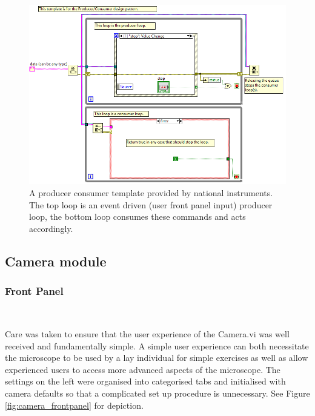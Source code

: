 \begin{figure}
\centering
\includegraphics[width=0.8\linewidth]{Figures/standard_pro_cons}
\caption[LabVIEW Producer Consumer Template]{A producer consumer template provided by national instruments.
The top loop is an event driven (user front panel input) producer loop, the bottom loop consumes these commands and acts accordingly.}
\label{fig:standard_pro_cons}
\end{figure}


\subsection{Camera module}



\subsubsection{Front Panel}~

Care was taken to ensure that the user experience of the Camera.vi was well received and fundamentally simple.
A simple user experience can both necessitate the microscope to be used by a lay individual for simple exercises as well as allow experienced users to access more advanced aspects of the microscope.
The settings on the left were organised into categorised tabs and initialised with camera defaults so that a complicated set up procedure is unnecessary.
See Figure \ref{fig:camera_frontpanel} for depiction.

